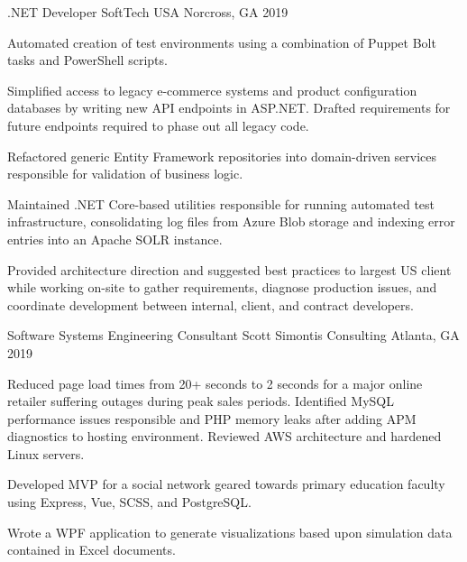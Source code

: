 \begin{cventries}
  \cventry
    {.NET Developer} %
    {SoftTech USA} %
    {Norcross, GA} %
    {2019} %
    {
      \begin{cvitems} %
        \item {Automated creation of test environments using a combination of Puppet Bolt tasks and PowerShell scripts.}
        \item {Simplified access to legacy e-commerce systems and product configuration databases by writing new API endpoints in ASP.NET. Drafted requirements for future endpoints required to phase out all legacy code.}
        \item {Refactored generic Entity Framework repositories into domain-driven services responsible for validation of business logic.}
        \item {Maintained .NET Core-based utilities responsible for running automated test infrastructure, consolidating log files from Azure Blob storage and indexing error entries into an Apache SOLR instance.}
        \item {Provided architecture direction and suggested best practices to largest US client while working on-site to gather requirements, diagnose production issues, and coordinate development between internal, client, and contract developers.}
      \end{cvitems}
    }

  \cventry
    {Software Systems Engineering Consultant} %
    {Scott Simontis Consulting} %
    {Atlanta, GA} %
    {2019} %
    {
      \begin{cvitems} %
        \item {Reduced page load times from 20+ seconds to 2 seconds for a major online retailer suffering outages during peak sales periods. Identified MySQL performance issues responsible and PHP memory leaks after adding  APM diagnostics to hosting environment. Reviewed AWS architecture and hardened Linux servers.}
        \item {Developed MVP for a social network geared towards primary education faculty using Express, Vue, SCSS, and PostgreSQL.}
        \item {Wrote a WPF application to generate visualizations based upon simulation data contained in Excel documents.}
      \end{cvitems}
    }


\end{cventries}
